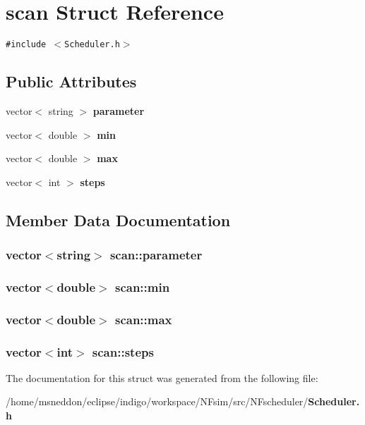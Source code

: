 \section{scan Struct Reference}
\label{structscan}
{\tt \#include $<$Scheduler.h$>$}

\subsection*{Public Attributes}
\begin{CompactItemize}
\item 
vector$<$ string $>$ {\bf parameter}
\item 
vector$<$ double $>$ {\bf min}
\item 
vector$<$ double $>$ {\bf max}
\item 
vector$<$ int $>$ {\bf steps}
\end{CompactItemize}


\subsection{Member Data Documentation}
\subsubsection{\setlength{\rightskip}{0pt plus 5cm}vector$<$string$>$ {\bf scan::parameter}}\label{structscan_d35df7d4a9afd5f7ed2ff565578ca5ee}


\subsubsection{\setlength{\rightskip}{0pt plus 5cm}vector$<$double$>$ {\bf scan::min}}\label{structscan_69de89d84300838ecf023e84413f0575}


\subsubsection{\setlength{\rightskip}{0pt plus 5cm}vector$<$double$>$ {\bf scan::max}}\label{structscan_f3f102e6967d3c80d380e613c27444ec}


\subsubsection{\setlength{\rightskip}{0pt plus 5cm}vector$<$int$>$ {\bf scan::steps}}\label{structscan_744124dd3b3f269f0b855cb7b8dfa5ae}




The documentation for this struct was generated from the following file:\begin{CompactItemize}
\item 
/home/msneddon/eclipse/indigo/workspace/NFsim/src/NFscheduler/{\bf Scheduler.h}\end{CompactItemize}
